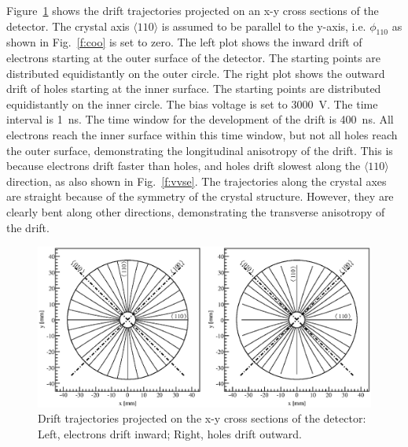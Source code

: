 \documentclass[epj]{svjour}
\begin{document}
Figure~\ref{f:trjs} shows the drift trajectories projected on an x-y
cross sections of the detector. The crystal axis $\langle 110 \rangle$
is assumed to be parallel to the y-axis, i.e. $\phi_{110}$ as shown in
Fig.~\ref{f:coo} is set to zero. The left plot shows the inward drift
of electrons starting at the outer surface of the detector. The
starting points are distributed equidistantly on the outer circle.
The right plot shows the outward drift of holes starting at the inner
surface. The starting points are distributed equidistantly on the
inner circle. The bias voltage is set to 3000~V. The time interval is
1~ns. The time window for the development of the drift is 400~ns. All
electrons reach the inner surface within this time window, but not all
holes reach the outer surface, demonstrating the longitudinal
anisotropy of the drift. This is because electrons drift faster than
holes, and holes drift slowest along the $\langle 110 \rangle$
direction, as also shown in Fig.~\ref{f:vvse}. The trajectories along
the crystal axes are straight because of the symmetry of the crystal
structure. However, they are clearly bent along other directions,
demonstrating the transverse anisotropy of the drift.
\begin{figure}[htbp]
\centering
\includegraphics[width=0.8\linewidth]{trjs} 
\caption{Drift trajectories projected on the x-y cross sections of the
detector: Left, electrons drift inward; Right, holes drift outward.}
\label{f:trjs} 
\end{figure} 
 
\end{document}
